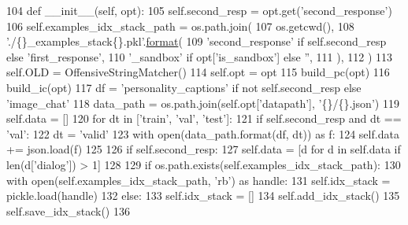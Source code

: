 \begin{DoxyCode}
104     \textcolor{keyword}{def }\_\_init\_\_(self, opt):
105         self.second\_resp = opt.get(\textcolor{stringliteral}{'second\_response'})
106         self.examples\_idx\_stack\_path = os.path.join(
107             os.getcwd(),
108             \textcolor{stringliteral}{'./\{\}\_examples\_stack\{\}.pkl'}.\hyperlink{namespaceparlai_1_1chat__service_1_1services_1_1messenger_1_1shared__utils_a32e2e2022b824fbaf80c747160b52a76}{format}(
109                 \textcolor{stringliteral}{'second\_response'} \textcolor{keywordflow}{if} self.second\_resp \textcolor{keywordflow}{else} \textcolor{stringliteral}{'first\_response'},
110                 \textcolor{stringliteral}{'\_sandbox'} \textcolor{keywordflow}{if} opt[\textcolor{stringliteral}{'is\_sandbox'}] \textcolor{keywordflow}{else} \textcolor{stringliteral}{''},
111             ),
112         )
113         self.OLD = OffensiveStringMatcher()
114         self.opt = opt
115         build\_pc(opt)
116         build\_ic(opt)
117         df = \textcolor{stringliteral}{'personality\_captions'} \textcolor{keywordflow}{if} \textcolor{keywordflow}{not} self.second\_resp \textcolor{keywordflow}{else} \textcolor{stringliteral}{'image\_chat'}
118         data\_path = os.path.join(self.opt[\textcolor{stringliteral}{'datapath'}], \textcolor{stringliteral}{'\{\}/\{\}.json'})
119         self.data = []
120         \textcolor{keywordflow}{for} dt \textcolor{keywordflow}{in} [\textcolor{stringliteral}{'train'}, \textcolor{stringliteral}{'val'}, \textcolor{stringliteral}{'test'}]:
121             \textcolor{keywordflow}{if} self.second\_resp \textcolor{keywordflow}{and} dt == \textcolor{stringliteral}{'val'}:
122                 dt = \textcolor{stringliteral}{'valid'}
123             with open(data\_path.format(df, dt)) \textcolor{keyword}{as} f:
124                 self.data += json.load(f)
125 
126         \textcolor{keywordflow}{if} self.second\_resp:
127             self.data = [d \textcolor{keywordflow}{for} d \textcolor{keywordflow}{in} self.data \textcolor{keywordflow}{if} len(d[\textcolor{stringliteral}{'dialog'}]) > 1]
128 
129         \textcolor{keywordflow}{if} os.path.exists(self.examples\_idx\_stack\_path):
130             with open(self.examples\_idx\_stack\_path, \textcolor{stringliteral}{'rb'}) \textcolor{keyword}{as} handle:
131                 self.idx\_stack = pickle.load(handle)
132         \textcolor{keywordflow}{else}:
133             self.idx\_stack = []
134             self.add\_idx\_stack()
135             self.save\_idx\_stack()
136 
\end{DoxyCode}


